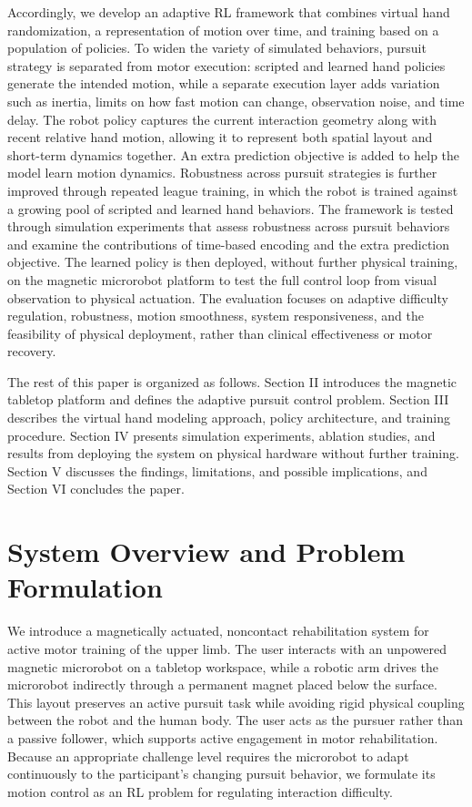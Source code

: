 \documentclass[journal,twoside,web]{ieeecolor2}
\begin{document}
Accordingly, we develop an adaptive RL framework that combines virtual hand randomization, a representation of motion over time, and training based on a population of policies. To widen the variety of simulated behaviors, pursuit strategy is separated from motor execution: scripted and learned hand policies generate the intended motion, while a separate execution layer adds variation such as inertia, limits on how fast motion can change, observation noise, and time delay. The robot policy captures the current interaction geometry along with recent relative hand motion, allowing it to represent both spatial layout and short-term dynamics together. An extra prediction objective is added to help the model learn motion dynamics. Robustness across pursuit strategies is further improved through repeated league training, in which the robot is trained against a growing pool of scripted and learned hand behaviors. The framework is tested through simulation experiments that assess robustness across pursuit behaviors and examine the contributions of time-based encoding and the extra prediction objective. The learned policy is then deployed, without further physical training, on the magnetic microrobot platform to test the full control loop from visual observation to physical actuation. The evaluation focuses on adaptive difficulty regulation, robustness, motion smoothness, system responsiveness, and the feasibility of physical deployment, rather than clinical effectiveness or motor recovery.

The rest of this paper is organized as follows. Section II introduces the magnetic tabletop platform and defines the adaptive pursuit control problem. Section III describes the virtual hand modeling approach, policy architecture, and training procedure. Section IV presents simulation experiments, ablation studies, and results from deploying the system on physical hardware without further training. Section V discusses the findings, limitations, and possible implications, and Section VI concludes the paper.

\section{System Overview and Problem Formulation}
We introduce a magnetically actuated, noncontact rehabilitation system for active motor training of the upper limb. The user interacts with an unpowered magnetic microrobot on a tabletop workspace, while a robotic arm drives the microrobot indirectly through a permanent magnet placed below the surface. This layout preserves an active pursuit task while avoiding rigid physical coupling between the robot and the human body. The user acts as the pursuer rather than a passive follower, which supports active engagement in motor rehabilitation. Because an appropriate challenge level requires the microrobot to adapt continuously to the participant's changing pursuit behavior, we formulate its motion control as an RL problem for regulating interaction difficulty.
\end{document}

